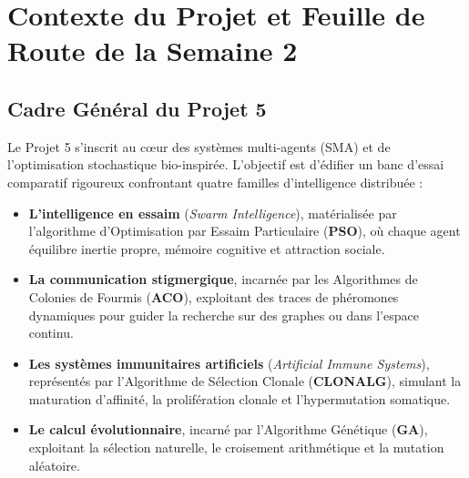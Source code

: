 \documentclass[11pt,a4paper]{article}
\begin{document}
\section{Contexte du Projet et Feuille de Route de la Semaine 2}

\subsection{Cadre Général du Projet 5}
Le Projet 5 s'inscrit au cœur des systèmes multi-agents (SMA) et de l'optimisation stochastique bio-inspirée. L'objectif est d'édifier un banc d'essai comparatif rigoureux confrontant quatre familles d'intelligence distribuée :
\begin{itemize}\setlength{\itemsep}{0.1em}
    \item \textbf{L'intelligence en essaim} (\textit{Swarm Intelligence}), matérialisée par l'algorithme d'Optimisation par Essaim Particulaire (\textbf{PSO}), où chaque agent équilibre inertie propre, mémoire cognitive et attraction sociale.
    \item \textbf{La communication stigmergique}, incarnée par les Algorithmes de Colonies de Fourmis (\textbf{ACO}), exploitant des traces de phéromones dynamiques pour guider la recherche sur des graphes ou dans l'espace continu.
    \item \textbf{Les systèmes immunitaires artificiels} (\textit{Artificial Immune Systems}), représentés par l'Algorithme de Sélection Clonale (\textbf{CLONALG}), simulant la maturation d'affinité, la prolifération clonale et l'hypermutation somatique.
    \item \textbf{Le calcul évolutionnaire}, incarné par l'Algorithme Génétique (\textbf{GA}), exploitant la sélection naturelle, le croisement arithmétique et la mutation aléatoire.
\end{itemize}
\end{document}
